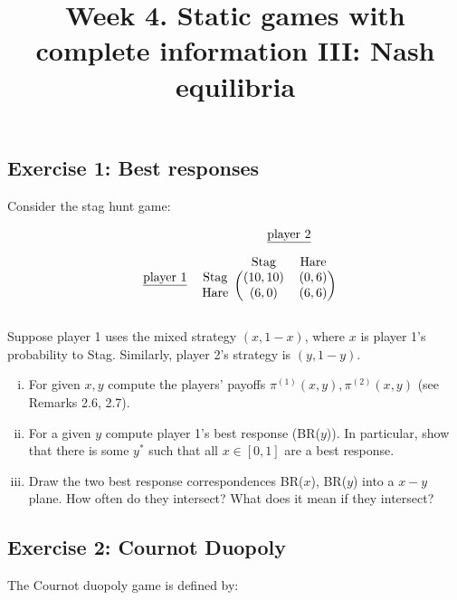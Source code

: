 \documentclass[10pt]{article}
\title{\textbf{Week 4.} Static games with complete information III: Nash equilibria}
\date{}
\begin{document}
\maketitle
\vspace{-1.5cm}

\subsection*{Exercise 1: Best responses}

Consider the stag hunt game:

\begin{equation*}
    \begin{blockarray}{cccc}
       & & \BAmulticolumn{2}{c}{\underline{\text{player 2}}} \\ [1em]
       & & \text{Stag} & \text{Hare} \\
        \begin{block}{cc(cc)}
\underline{\text{player 1}} & \text{Stag} & (10, 10) & (0, 6) \\
                            & \text{Hare} & (6, 0) & (6, 6) \\
        \end{block}
    \end{blockarray}
\end{equation*}

Suppose player 1 uses the mixed strategy \((x, 1- x)\), where \(x\) is player 1's
probability to Stag. Similarly, player 2's strategy is \((y, 1 - y)\).

\begin{enumerate}[(i)]
    \item For given \(x, y\) compute the players' payoffs \(\pi^{(1)}(x, y),
    \pi^{(2)}(x, y)\) (see Remarks 2.6, 2.7).
    \item For a given \(y\) compute player 1's best response (BR(\(y\))). In
    particular, show that there is some \(y^{*}\) such that all \(x \in [0,
    1]\) are a best response.
    \item Draw the two best response correspondences BR(\(x\)), BR(\(y\)) into a
    \(x-y\) plane. How often do they intersect? What does it mean if they
    intersect?
\end{enumerate}

\subsection*{Exercise 2: Cournot Duopoly}

The Cournot duopoly game is defined by:
\end{document}
